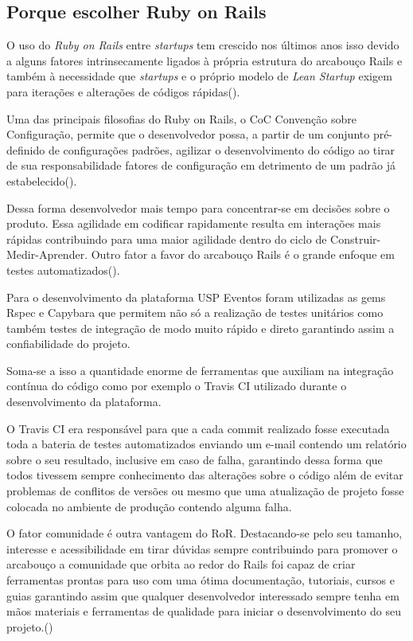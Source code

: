 \subsection{Porque escolher Ruby on Rails }
\par O uso do \emph{Ruby on Rails} entre \emph{startups} tem crescido nos últimos anos isso devido a alguns fatores intrinsecamente ligados à própria estrutura do arcabouço Rails e também à necessidade que \emph{startups} e o próprio modelo de \emph{Lean Startup} exigem para iterações e alterações de códigos rápidas(\cite{lilia:16}).
\par Uma das principais filosofias do Ruby on Rails, o CoC \- Convenção sobre Configuração, permite que o desenvolvedor possa, a partir de um conjunto pré-definido de configurações padrões, agilizar o desenvolvimento do código ao tirar de sua responsabilidade fatores de configuração em detrimento de um padrão já estabelecido(\cite{morrice:15}).
\par Dessa forma desenvolvedor mais tempo para concentrar-se em decisões sobre o produto. Essa agilidade em codificar rapidamente resulta em interações mais rápidas contribuindo para uma maior agilidade dentro do ciclo de Construir-Medir-Aprender. Outro fator a favor do arcabouço Rails é o grande enfoque em testes automatizados(\cite{morrice:15}).
\par Para o desenvolvimento da plataforma USP Eventos foram utilizadas as gems Rspec e Capybara que permitem não só a realização de testes unitários como também testes de integração de modo muito rápido e direto garantindo assim a confiabilidade do projeto.
\par Soma-se a isso a quantidade enorme de ferramentas que auxiliam na integração contínua do código como por exemplo o Travis CI utilizado durante o desenvolvimento da plataforma.
\par O Travis CI era responsável para que a cada commit realizado fosse executada toda a bateria de testes automatizados enviando um e-mail contendo um relatório sobre o seu resultado, inclusive em caso de falha, garantindo dessa forma que todos tivessem sempre conhecimento das alterações sobre o código além de evitar problemas de conflitos de versões ou mesmo que uma atualização de projeto fosse colocada no ambiente de produção contendo alguma falha.
\par O fator comunidade é outra vantagem do RoR. Destacando-se pelo seu tamanho, interesse e acessibilidade em tirar dúvidas sempre contribuindo para promover o arcabouço a comunidade que orbita ao redor do Rails foi capaz de criar ferramentas prontas para uso com uma ótima documentação, tutoriais, cursos e guias garantindo assim que qualquer desenvolvedor interessado sempre tenha em mãos materiais e ferramentas de qualidade para iniciar o desenvolvimento do seu projeto.(\cite{lilia:16})
